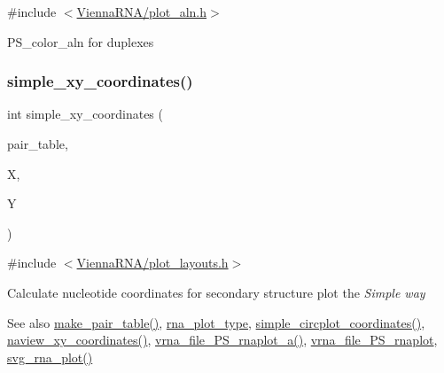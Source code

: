 {\ttfamily \#include $<$\mbox{\hyperlink{plot__aln_8h}{Vienna\+R\+N\+A/plot\+\_\+aln.\+h}}$>$}

P\+S\+\_\+color\+\_\+aln for duplexes \mbox{\label{group__plotting__utils_gaf4b9173e7d3fd361c3c85e6def194123}} 
\subsubsection{\texorpdfstring{simple\+\_\+xy\+\_\+coordinates()}{simple\_xy\_coordinates()}}
{\footnotesize\ttfamily int simple\+\_\+xy\+\_\+coordinates (\begin{DoxyParamCaption}\item[{short $\ast$}]{pair\+\_\+table,  }\item[{float $\ast$}]{X,  }\item[{float $\ast$}]{Y }\end{DoxyParamCaption})}



{\ttfamily \#include $<$\mbox{\hyperlink{plot__layouts_8h}{Vienna\+R\+N\+A/plot\+\_\+layouts.\+h}}$>$}



Calculate nucleotide coordinates for secondary structure plot the {\itshape Simple way} 

\begin{DoxySeeAlso}{See also}
\mbox{\hyperlink{group__struct__utils_ga89c32307ee50a0026f4a3131fac0845a}{make\+\_\+pair\+\_\+table()}}, \mbox{\hyperlink{group__plotting__utils_ga5964c4581431b098b80027d6e14dcdd4}{rna\+\_\+plot\+\_\+type}}, \mbox{\hyperlink{group__plotting__utils_gac4ea13d35308f09940178d2b05a248c2}{simple\+\_\+circplot\+\_\+coordinates()}}, \mbox{\hyperlink{group__plotting__utils_ga948111b910926f0405a3fa920c790816}{naview\+\_\+xy\+\_\+coordinates()}}, \mbox{\hyperlink{plot__structure_8h_a139a31dd0ba9fc6612431f67de901c31}{vrna\+\_\+file\+\_\+\+P\+S\+\_\+rnaplot\+\_\+a()}}, \mbox{\hyperlink{plot__structure_8h_abdc8f6548ba4a3bc3cd868ccbcfdb86a}{vrna\+\_\+file\+\_\+\+P\+S\+\_\+rnaplot}}, \mbox{\hyperlink{plot__structure_8h_ae7853539b5df98f294b4af434e979304}{svg\+\_\+rna\+\_\+plot()}}
\end{DoxySeeAlso}

